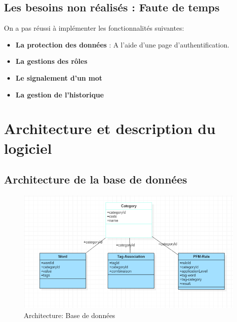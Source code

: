 \documentclass[12pt,a4paper]{article}
\begin{document}
\subsection{Les besoins non réalisés : Faute de temps}

On a pas réussi à implémenter les  fonctionnalités suivantes:

\begin{itemize}
\item \textbf{La protection des données } : A l'aide d'une page d'authentification.
\item \textbf{La gestions des rôles }
\item \textbf{Le signalement d'un mot}
\item \textbf{La gestion de l'historique}
\end{itemize}


\section{Architecture et description du logiciel}
\subsection{Architecture de la base de données }
\begin{figure}[h]
\centering
\includegraphics[width=150mm]{img/basefinal.PNG}
\caption{Architecture: Base de données}
\label{Tux}
\end{figure}
\end{document}
